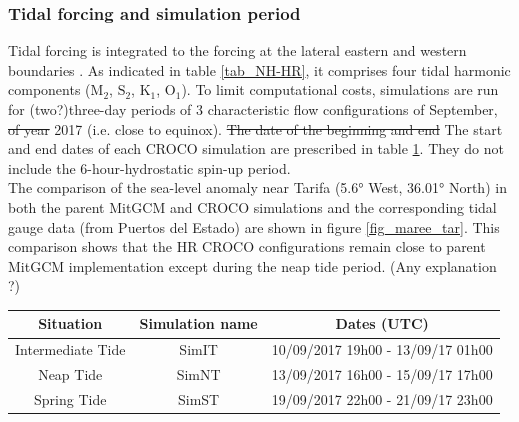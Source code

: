 \subsubsection{Tidal forcing and simulation period}
Tidal forcing is integrated to the forcing \color{blue} at the lateral eastern and western boundaries  \color{black}. As indicated in table \ref{tab_NH-HR}, it comprises four tidal harmonic \color{blue} components ($\text{M}_{\text{2}}$, $\text{S}_{\text{2}}$, $\text{K}_{\text{1}}$, $\text{O}_{\text{1}}$).
To limit computational costs\color{black}, simulations are run for (two?)three-day periods \color{blue}of 3 characteristic flow configurations of September, \sout{of year} 2017 (i.e. close to equinox). \sout{The date of the beginning and end} \color{blue}The start and end dates of each CROCO simulation are prescribed in table \ref{tab_dates_MIV}. \color{blue} They do \color{black} not include the 6-hour-hydrostatic spin-up period.\\ 

The comparison of the sea-level anomaly near Tarifa \color{blue}(5.6° West, 36.01° North) \color{black} in both the parent MitGCM and CROCO simulations and the corresponding tidal gauge data (from Puertos del Estado) are shown in figure \ref{fig_maree_tar}. \color{blue} This comparison shows that the HR CROCO configurations remain close to parent MitGCM implementation except during the neap tide period. \color{green}(Any explanation ?) \color{black}

\begin{table}[h]
        \centering
        \begin{tabular}{|c|c|c|}
                \hline
                Situation & Simulation name & Dates (UTC)\\
                \hline
                Intermediate Tide & SimIT & 10/09/2017 19h00 - 13/09/17 01h00  \\
                Neap Tide & SimNT & 13/09/2017 16h00 - 15/09/17 17h00 \\
                Spring Tide & SimST & 19/09/2017 22h00 - 21/09/17 23h00  \\
                \hline
        \end{tabular}
        \label{tab_dates_MIV}
\end{table}

